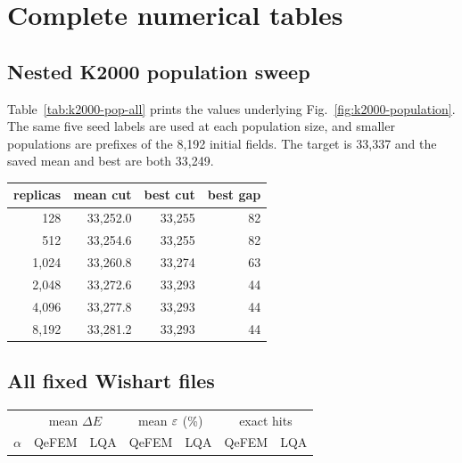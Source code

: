 \section{Complete numerical tables}
\label{app:fullresults}

\subsection{Nested K2000 population sweep}

Table~\ref{tab:k2000-pop-all} prints the values underlying
Fig.~\ref{fig:k2000-population}. The same five seed labels are used at
each population size, and smaller populations are prefixes of the
8,192 initial fields. The target is 33,337 and the saved \LQA{} mean
and best are both 33,249.

\begin{center}
\begin{minipage}{\textwidth}
\small
{}
\label{tab:k2000-pop-all}
\begin{tabular*}{\textwidth}{@{\extracolsep{\fill}}rrrr}
\toprule
replicas & mean cut & best cut & best gap\\
\midrule
128 & 33,252.0 & 33,255 & 82\\
512 & 33,254.6 & 33,255 & 82\\
1,024 & 33,260.8 & 33,274 & 63\\
2,048 & 33,272.6 & 33,293 & 44\\
4,096 & 33,277.8 & 33,293 & 44\\
8,192 & 33,281.2 & 33,293 & 44\\
\bottomrule
\end{tabular*}
\end{minipage}
\end{center}

\subsection{All fixed Wishart files}

\begin{center}
\begin{minipage}{\textwidth}
\small
{}
\label{tab:wishart-all}
\centering
\begin{tabular}{crrrrrr}
\toprule
& \multicolumn{2}{c}{mean $\Delta E$}
& \multicolumn{2}{c}{mean $\varepsilon$ (\%)}
& \multicolumn{2}{c}{exact hits}\\
$\alpha$ & QeFEM & LQA & QeFEM & LQA & QeFEM & LQA\\
\midrule

\end{tabular}
\end{minipage}
\end{center}

